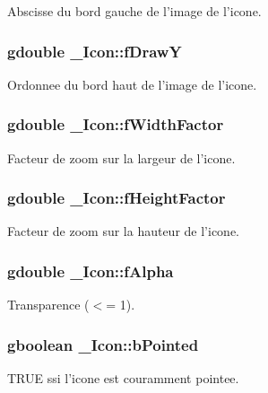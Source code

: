Abscisse du bord gauche de l'image de l'icone. 

\subsubsection{\setlength{\rightskip}{0pt plus 5cm}gdouble {\bf \_\-Icon::fDrawY}}\label{struct__Icon_004da82f852571bd9a1079f8a0feb3ce}


Ordonnee du bord haut de l'image de l'icone. 

\subsubsection{\setlength{\rightskip}{0pt plus 5cm}gdouble {\bf \_\-Icon::fWidthFactor}}\label{struct__Icon_abc592ad16e6cbc0b7a8c0e0b0e49cc8}


Facteur de zoom sur la largeur de l'icone. 

\subsubsection{\setlength{\rightskip}{0pt plus 5cm}gdouble {\bf \_\-Icon::fHeightFactor}}\label{struct__Icon_108dcb6efa468923cb16bd2bdf93556e}


Facteur de zoom sur la hauteur de l'icone. 

\subsubsection{\setlength{\rightskip}{0pt plus 5cm}gdouble {\bf \_\-Icon::fAlpha}}\label{struct__Icon_277c82817050d173831fee24327c4020}


Transparence ($<$= 1). 

\subsubsection{\setlength{\rightskip}{0pt plus 5cm}gboolean {\bf \_\-Icon::bPointed}}\label{struct__Icon_477df6868e6077e74f348fd2a773fd2a}


TRUE ssi l'icone est couramment pointee. 

